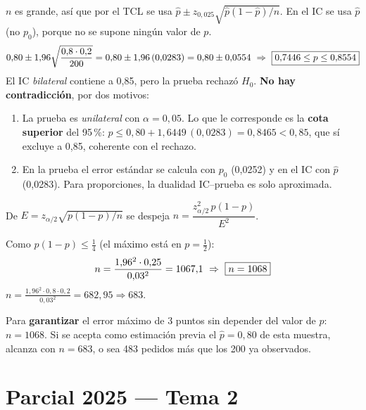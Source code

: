  $n$ es grande, así que por el TCL se usa $\hat p\pm z_{0,025}\sqrt{\hat p(1-\hat p)/n}$. En el IC se usa $\hat p$ (no $p_0$), porque no se supone ningún valor de $p$.
\[
0{,}80\pm1{,}96\sqrt{\frac{0{,}8\cdot0{,}2}{200}}=0{,}80\pm1{,}96\,(0{,}0283)=0{,}80\pm0{,}0554\ \Rightarrow\ \res{0{,}7446\le p\le0{,}8554}
\]
 El IC \emph{bilateral} contiene a 0,85, pero la prueba rechazó $H_0$. \textbf{No hay contradicción}, por dos motivos:
\begin{enumerate}
\item La prueba es \emph{unilateral} con $\alpha=0{,}05$. Lo que le corresponde es la \textbf{cota superior} del 95\,\%: $p\le0{,}80+1{,}6449\,(0{,}0283)=0{,}8465<0{,}85$, que sí excluye a 0,85, coherente con el rechazo.
\item En la prueba el error estándar se calcula con $p_0$ (0,0252) y en el IC con $\hat p$ (0,0283). Para proporciones, la dualidad IC--prueba es solo aproximada.
\end{enumerate}

 De $E=z_{\alpha/2}\sqrt{p(1-p)/n}$ se despeja $n=\dfrac{z_{\alpha/2}^2\,p(1-p)}{E^2}$.

 Como $p(1-p)\le\frac14$ (el máximo está en $p=\frac12$):
\[
n=\frac{1{,}96^2\cdot0{,}25}{0{,}03^2}=1067{,}1\ \Rightarrow\ \res{n=1068}
\]
 $n=\frac{1{,}96^2\cdot0{,}8\cdot0{,}2}{0{,}03^2}=682{,}95\Rightarrow683$.
\begin{resp}
Para \textbf{garantizar} el error máximo de 3 puntos sin depender del valor de $p$: $n=1068$. Si se acepta como estimación previa el $\hat p=0{,}80$ de esta muestra, alcanza con $n=683$, o sea 483 pedidos más que los 200 ya observados.
\end{resp}

\newpage
\section{Parcial 2025 --- Tema 2}

